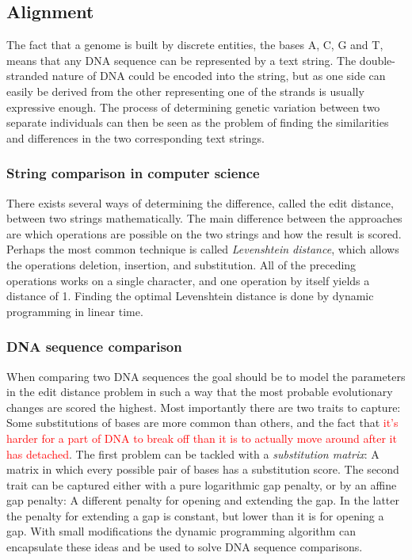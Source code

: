 \documentclass[thesis.tex]{subfiles}
\begin{document}
\subsection{Alignment}
The fact that a genome is built by discrete entities, the bases A, C, G and T, means that any DNA sequence can be represented by a text string. The double-stranded nature of DNA could be encoded into the string, but as one side can easily be derived from the other representing one of the strands is usually expressive enough. The process of determining genetic variation between two separate individuals can then be seen as the problem of finding the similarities and differences in the two corresponding text strings.
\subsubsection{String comparison in computer science}
There exists several ways of determining the difference, called the edit distance, between two strings mathematically. The main difference between the approaches are which operations are possible on the two strings and how the result is scored. Perhaps the most common technique is called \textit{Levenshtein distance}, which allows the operations deletion, insertion, and substitution. All of the preceding operations works on a single character, and one operation by itself yields a distance of 1. Finding the optimal Levenshtein distance is done by dynamic programming in linear time.
\subsubsection{DNA sequence comparison}
When comparing two DNA sequences the goal should be to model the parameters in the edit distance problem in such a way that the most probable evolutionary changes are scored the highest. Most importantly there are two traits to capture: Some substitutions of bases are more common than others, and the fact that \textcolor{red}{it's harder for a part of DNA to break off than it is to actually move around after it has detached}. The first problem can be tackled with a \textit{substitution matrix}: A matrix in which every possible pair of bases has a substitution score. The second trait can be captured either with a pure logarithmic gap penalty, or by an affine gap penalty: A different penalty for opening and extending the gap. In the latter the penalty for extending a gap is constant, but lower than it is for opening a gap. With small modifications the dynamic programming algorithm can encapsulate these ideas and be used to solve DNA sequence comparisons. 
\end{document}
